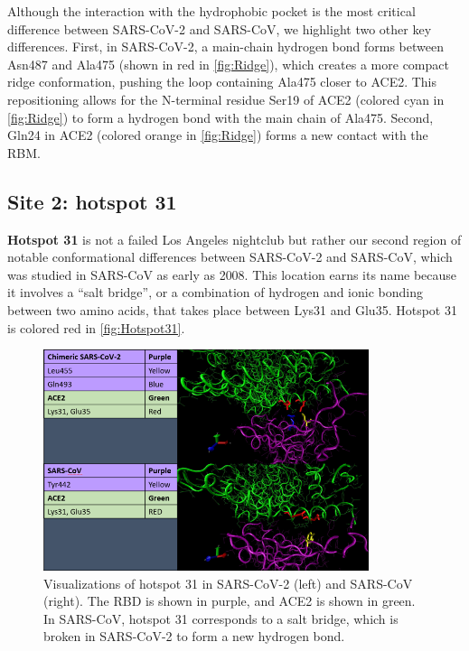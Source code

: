 Although the interaction with the hydrophobic pocket is the most critical difference between SARS-CoV-2 and SARS-CoV, we highlight two other key differences. First, in SARS-CoV-2, a main-chain hydrogen bond forms between Asn487 and Ala475 (shown in red in \autoref{fig:Ridge}), which creates a more compact ridge conformation, pushing the loop containing Ala475 closer to ACE2. This repositioning allows for the N-terminal residue Ser19 of ACE2 (colored cyan in \autoref{fig:Ridge}) to form a hydrogen bond with the main chain of Ala475. Second, Gln24 in ACE2 (colored orange in \autoref{fig:Ridge}) forms a new contact with the RBM.

\FloatBarrier
{}
\subsection{Site 2: hotspot 31}

\textbf{Hotspot 31} is not a failed Los Angeles nightclub but rather our second region of notable conformational differences between SARS-CoV-2 and SARS-CoV, which was studied in SARS-CoV as early as 2008. This location earns its name because it involves a ``salt bridge'', or a combination of hydrogen and ionic bonding between two amino acids, that takes place between Lys31 and Glu35. Hotspot 31 is colored red in \autoref{fig:Hotspot31}.\\

\begin{qbox}\end{qbox}

\begin{figure}[h]
	\centering
	\mySfFamily
	\includegraphics[width = 0.85\textwidth]{../images/Hotspot31.png}
	\caption{Visualizations of hotspot 31 in SARS-CoV-2 (left) and SARS-CoV (right). The RBD is shown in purple, and ACE2 is shown in green. In SARS-CoV, hotspot 31 corresponds to a salt bridge, which is broken in SARS-CoV-2 to form a new hydrogen bond.}
	\label{fig:Hotspot31}
\end{figure}

